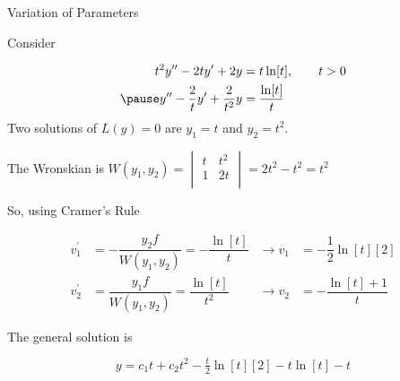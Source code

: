 \documentclass{beamer}
\begin{document}
\begin{frame}{Variation of Parameters}
\begin{example}
Consider

\vspace{-6mm}
\begin{equation*}
\begin{aligned}
t^2 y^{\prime\prime}-2t y^\prime+2y&=t\ln[t]
,\qquad t>0\\\pause
y^{\prime\prime}-\dfrac{2}{t}y^\prime+\dfrac{2}{t^2}y&=\dfrac{\ln[t]}{t}
\end{aligned}
\end{equation*}\pause
Two solutions of $L(y)=0$ are $y_1=t$ and $y_2=t^2$.\pause

\vspace{2mm}
The Wronskian is $W(y_1,y_2)=
\begin{vmatrix}
t & t^2 \\
1 & 2t  \\
\end{vmatrix}
=2t^2-t^2=t^2$\pause

\vspace{1mm}
So, using Cramer's Rule

\vspace{-4mm}
\begin{equation*}
\begin{aligned}
v_1^\prime &= -\dfrac{y_2 f}{W(y_1, y_2)}=-\dfrac{\ln[t]}{t} 
&\rightarrow v_1 &= -\dfrac{1}{2}\ln[t][2]\\
v_2^\prime &= \dfrac{y_1 f}{W(y_1, y_2)}=\dfrac{\ln[t]}{t^2}
&\rightarrow v_2 &= -\dfrac{\ln[t]+1}{t}
\end{aligned}
\end{equation*}\pause

\vspace{-3mm}
The general solution is

\vspace{-4mm}
\begin{equation*}
y=c_1t+c_2t^2-\tfrac{t}{2}\ln[t][2]-t\ln[t]-t
\end{equation*}
\end{example}
\end{frame}
\end{document}
